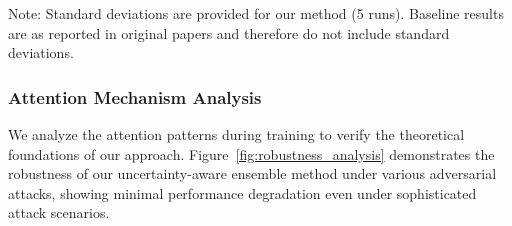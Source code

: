 \documentclass[journal]{IEEEtran}
\begin{document}
\begin{table}[t]
\centering
\caption{Anomaly Detection Performance Comparison on SWaT Dataset - FPR(\%), Precision(\%), Recall(\%), and F1-Score(\%) of Our Model with Baseline Methods}
\label{tab:swat_comparison}
\footnotesize{Note: Standard deviations are provided for our method (5 runs). Baseline results are as reported in original papers and therefore do not include standard deviations.}
\end{table}

\subsubsection{Attention Mechanism Analysis}

We analyze the attention patterns during training to verify the theoretical foundations of our approach. Figure~\ref{fig:robustness_analysis} demonstrates the robustness of our uncertainty-aware ensemble method under various adversarial attacks, showing minimal performance degradation even under sophisticated attack scenarios.
\end{document}
